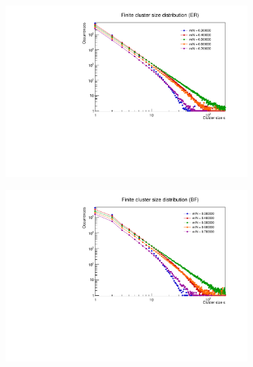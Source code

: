 \begin{figure}
	\centering
	\begin{subfigure}[b]{0.45\linewidth}
		\includegraphics[width=\linewidth]{images/ClusterDistrER.pdf}
	\end{subfigure}
	\hspace{0.5em}
	\begin{subfigure}[b]{0.45\linewidth}
		\includegraphics[width=\linewidth]{images/ClusterDistrBF.pdf}
	\end{subfigure}
	
	\vspace{0.5em} %
	

\end{figure}
